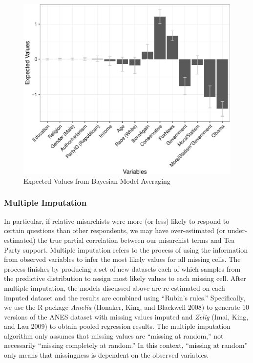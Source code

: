 \documentclass[12pt,]{article}
\begin{document}
\begin{figure}[htbp]
\centering
\includegraphics{figures/bma3-1.pdf}
\caption{Expected Values from Bayesian Model Averaging}
\end{figure}

\clearpage

\subsubsection{Multiple Imputation}\label{multiple-imputation}

In particular, if relative misarchists were more (or less) likely to
respond to certain questions than other respondents, we may have
over-estimated (or under-estimated) the true partial correlation between
our misarchist terms and Tea Party support. Multiple imputation refers
to the process of using the information from observed variables to infer
the most likely values for all missing cells. The process finishes by
producing a set of new datasets each of which samples from the
predictive distribution to assign most likely values to each missing
cell. After multiple imputation, the models discussed above are
re-estimated on each imputed dataset and the results are combined using
``Rubin's rules.'' Specifically, we use the R package \emph{Amelia}
(Honaker, King, and Blackwell 2008) to generate 10 versions of the ANES
dataset with missing values imputed and \emph{Zelig} (Imai, King, and Lau 2009) to obtain pooled
regression results. The multiple imputation algorithm only assumes that
missing values are ``missing at random,'' not necessarily ``missing
completely at random.'' In this context, ``missing at random'' only
means that missingness is dependent on the observed variables.
\end{document}

